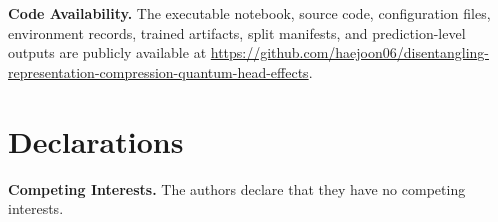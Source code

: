 \documentclass[pdflatex,sn-mathphys-ay]{sn-jnl}
\begin{document}
\textbf{Code Availability.} The executable notebook, source code, configuration files, environment records, trained artifacts, split manifests, and prediction-level outputs are publicly available at \url{https://github.com/haejoon06/disentangling-representation-compression-quantum-head-effects}.


\section*{Declarations}

\textbf{Competing Interests.} The authors declare that they have no competing interests.



\end{document}
